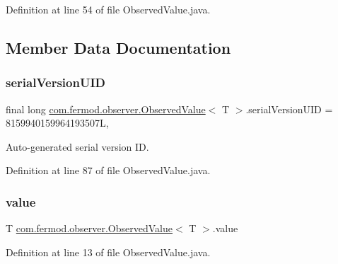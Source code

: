 Definition at line 54 of file Observed\+Value.\+java.



\subsection{Member Data Documentation}
\mbox{\label{classcom_1_1fermod_1_1observer_1_1ObservedValue_ad494135b9a0d52423069327f49e93937}} 
\subsubsection{\texorpdfstring{serialVersionUID}{serialVersionUID}}
{\footnotesize\ttfamily final long \mbox{\hyperlink{classcom_1_1fermod_1_1observer_1_1ObservedValue}{com.\+fermod.\+observer.\+Observed\+Value}}$<$ T $>$.serial\+Version\+U\+ID = 8159940159964193507L\hspace{0.3cm}{\ttfamily [static]}, {\ttfamily [private]}}



Auto-\/generated serial version ID. 



Definition at line 87 of file Observed\+Value.\+java.

\mbox{\label{classcom_1_1fermod_1_1observer_1_1ObservedValue_a947edfec1982817155067f495b0c8cf7}} 
\subsubsection{\texorpdfstring{value}{value}}
{\footnotesize\ttfamily T \mbox{\hyperlink{classcom_1_1fermod_1_1observer_1_1ObservedValue}{com.\+fermod.\+observer.\+Observed\+Value}}$<$ T $>$.value\hspace{0.3cm}{\ttfamily [private]}}



Definition at line 13 of file Observed\+Value.\+java.

